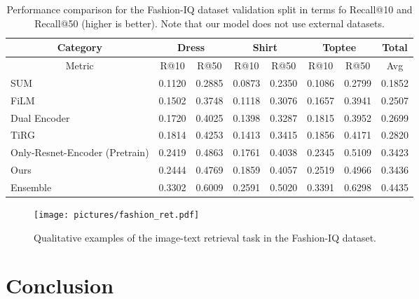 \documentclass[10pt,twocolumn,letterpaper]{article}
\begin{document}
\begin{table*}
\begin{center}
\begin{tabular}{|l|cc|cc|cc|c|}
\hline
\multicolumn{1}{|c|}{Category} & \multicolumn{2}{c|}{Dress} & \multicolumn{2}{c|}{Shirt} & \multicolumn{2}{c|}{Toptee} & Total \\ 
\hline
\multicolumn{1}{|c|}{Metric}   & R@10         & R@50        & R@10        & R@50        & R@10         & R@50         & Avg   \\ 
\hline\hline
SUM   & 0.1120        & 0.2885       & 0.0873       & 0.2350       & 0.1086        & 0.2799        & 0.1852 \\
FiLM~\cite{perez-AAAI-2018}   & 0.1502        & 0.3748       & 0.1118       & 0.3076       & 0.1657        & 0.3941        &  0.2507 \\
Dual Encoder & 0.1720        & 0.4025       & 0.1398       & 0.3287       & 0.1815        & 0.3952        & 0.2699 \\ 
TiRG~\cite{vo-cvpr-2019}   & 0.1814        & 0.4253       & 0.1413       & 0.3415       & 0.1856        & 0.4171        &  0.2820 \\
\hline
Only-Resnet-Encoder (Pretrain)  & 0.2419        & 0.4863       & 0.1761       & 0.4038       & 0.2345        & 0.5109        & 0.3423  \\
Ours    & 0.2444        & 0.4769       & 0.1859       & 0.4057       & 0.2519        & 0.4966        & 0.3436 \\
Ensemble   & 	0.3302  & 	0.6009  &   0.2591 & 	0.5020 & 	0.3391  & 	0.6298 &   0.4435\\
\hline
\end{tabular}
\end{center}
\caption{Performance comparison for the Fashion-IQ dataset validation split in terms fo Recall@10 and Recall@50 (higher is better). Note that our model does not use external datasets.}
\label{tbl:results}
\end{table*}



\begin{figure}[t]
\centering
\texttt{[image: pictures/fashion\_ret.pdf]}
\caption{Qualitative examples of the image-text retrieval task in the Fashion-IQ dataset.
}
\label{fig:examples}
\end{figure}



\section{Conclusion}
\end{document}
